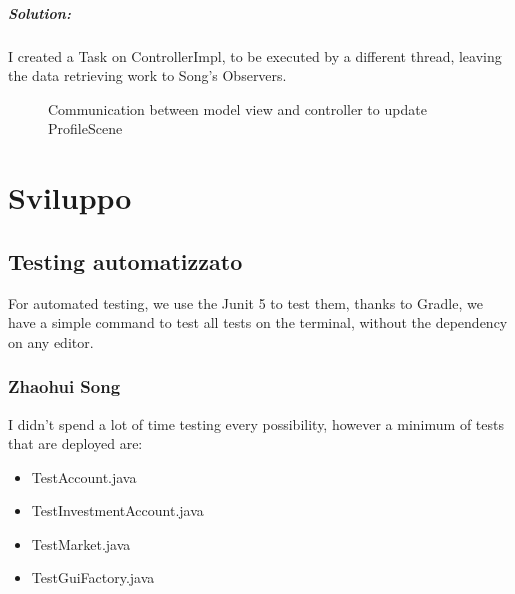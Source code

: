 \documentclass[a4paper,12pt]{report}
\begin{document}
        \paragraph{Solution:}I created a Task on ControllerImpl, to be executed by a different thread, leaving the data retrieving work to Song's Observers.
            \begin{figure}[H]
                \caption{Communication between model view and controller to update ProfileScene}
                \label{fig:my_label}
            \end{figure}



\chapter{Sviluppo}
\section{Testing automatizzato}
For automated testing, we use the Junit 5 to test them, thanks to Gradle, we have a simple command to test all tests on the terminal, without the dependency on any editor. 

\subsection{Zhaohui Song}
I didn't spend a lot of time testing every possibility, however a minimum of tests that are deployed are:
\begin{itemize}
    \item TestAccount.java
    \item TestInvestmentAccount.java
    \item TestMarket.java
    \item TestGuiFactory.java
\end{itemize}
\end{document}
